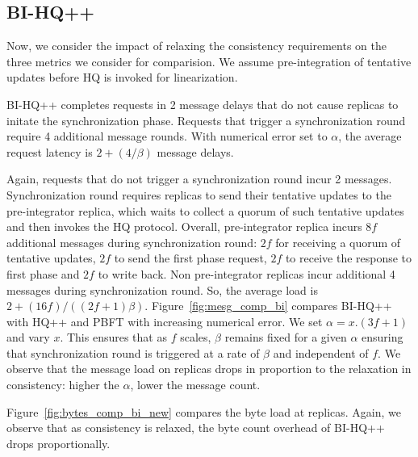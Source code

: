 \documentclass[twocolumn,10pt]{article}
\begin{document}
\subsection{BI-HQ++}
Now, we consider the impact of relaxing the consistency requirements on the three metrics we
consider for comparision. We assume pre-integration of tentative updates before HQ is invoked
for linearization.

 BI-HQ++ completes requests in 2 message delays that do not cause replicas
to initate the synchronization phase. Requests that trigger a synchronization round require
4 additional message rounds. With numerical error set to $\alpha$, the average request
latency is $2+(4/\beta)$ message delays.

 Again, requests that do not trigger a synchronization round incur 2 messages.
Synchronization round requires replicas to send their tentative updates to
the pre-integrator replica, which waits to collect a quorum of such tentative updates and then 
invokes the HQ protocol. Overall, pre-integrator replica
incurs $8f$ additional messages during synchronization round: $2f$ for receiving a quorum of 
tentative updates, $2f$ to send the first phase
request, $2f$ to receive the response to first phase and $2f$ to write back. Non pre-integrator
replicas incur additional 4 messages during synchronization round. 
So, the average load is $2+(16f)/((2f+1)\beta)$. 
Figure~\ref{fig:mesg_comp_bi} compares BI-HQ++ with HQ++ and PBFT with increasing numerical error.
We set $\alpha= x.(3f+1)$ and vary $x$. This ensures that as $f$ scales, $\beta$ remains fixed
for a given $\alpha$ ensuring that synchronization round is triggered at a rate of $\beta$ and 
independent of $f$. We observe that the message
load on replicas drops in proportion to the relaxation in consistency: higher the $\alpha$, lower
the message count.  


Figure~\ref{fig:bytes_comp_bi_new} compares the byte load at replicas. 
Again, we observe that as consistency is relaxed, the byte count overhead of BI-HQ++ 
drops proportionally. 
\end{document}
